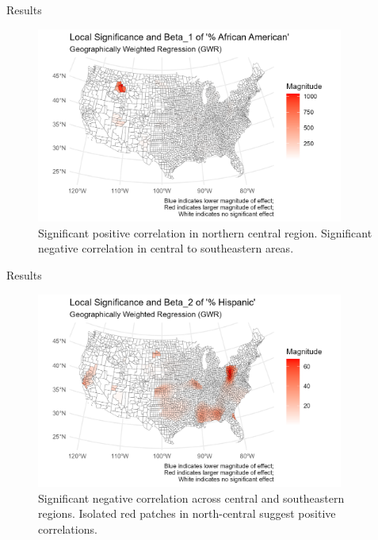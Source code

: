 \documentclass[
  ignorenonframetext,
]{beamer}
\begin{document}
\begin{frame}{Results}
\label{results-3}
\begin{figure}[H]

{\centering \includegraphics[width=0.9\textwidth,height=\textheight]{PresentationPhotos/blackplot.png}

}

\caption{Significant positive correlation in northern central region.
Significant negative correlation in central to southeastern areas.}

\end{figure}%
\end{frame}

\begin{frame}{Results}
\label{results-4}
\begin{figure}[H]

{\centering \includegraphics[width=0.9\textwidth,height=\textheight]{PresentationPhotos/hispanplot.png}

}

\caption{Significant negative correlation across central and
southeastern regions. Isolated red patches in north-central suggest
positive correlations.}

\end{figure}%
\end{frame}
\end{document}
